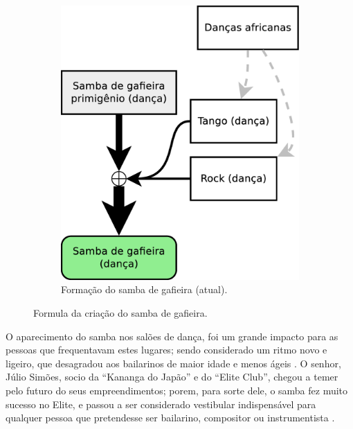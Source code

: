 \begin{figure}[h]
\begin{subfigure}[b]{0.385\textwidth}
    \includegraphics[width=\textwidth]{chapters/cap-historia-sambagafieira/sambagafieiraformula2.eps}
    \caption{Formação do samba de gafieira (atual).}
    \label{fig:formuladosambagafieira2}
  \end{subfigure}
\caption{Formula da criação do samba de gafieira.}
\label{fig:formuladosambagafieiraall}
\end{figure}


O aparecimento do samba nos salões de dança, 
foi um grande impacto para as pessoas que frequentavam estes lugares;
sendo considerado um ritmo novo e ligeiro,
que desagradou aos bailarinos de maior idade e menos ágeis \cite[pp. 6 - cad. B]{entrevistajuliojournalbrasil1}.
O senhor, Júlio Simões, socio da ``Kananga do Japão'' e
do ``Elite Club'', chegou a temer pelo futuro do seus empreendimentos; porem, para sorte dele, 
o samba fez muito sucesso no Elite,
e passou a ser considerado vestibular indispensável para qualquer pessoa que pretendesse ser bailarino, 
compositor ou instrumentista \cite[pp. 6 - cad. B]{entrevistajuliojournalbrasil1}.


